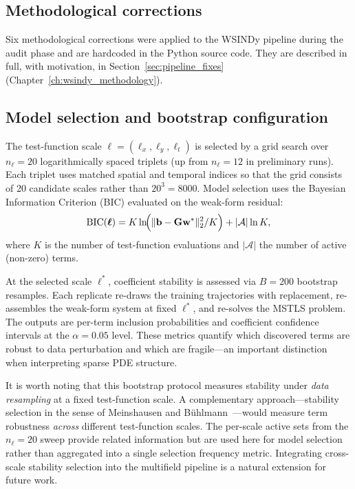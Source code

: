 \subsection{Methodological corrections}

Six methodological corrections were applied to the WSINDy pipeline during the
audit phase and are hardcoded in the Python source code.
They are described in full, with motivation, in
Section~\ref{sec:pipeline_fixes} (Chapter~\ref{ch:wsindy_methodology}).

\subsection{Model selection and bootstrap configuration}

The test-function scale $\boldsymbol{\ell} = (\ell_x, \ell_y, \ell_t)$ is
selected by a grid search over $n_{\ell} = 20$ logarithmically spaced
triplets (up from $n_{\ell} = 12$ in preliminary runs).  Each triplet uses
matched spatial and temporal indices so that the grid consists of 20 candidate
scales rather than $20^3 = 8000$.  Model selection uses the Bayesian
Information Criterion (BIC) evaluated on the weak-form residual:
\begin{equation}
  \mathrm{BIC}(\boldsymbol\ell)
  = K\ln\!\Bigl(\lVert\mathbf{b} - \mathbf{G}\mathbf{w}^*\rVert_2^2 / K\Bigr)
  + |\mathcal{A}|\ln K,
  \label{eq:wsindy_bic}
\end{equation}
where $K$ is the number of test-function evaluations and $|\mathcal{A}|$ the
number of active (non-zero) terms.

At the selected scale $\boldsymbol{\ell}^*$, coefficient stability is assessed
via $B = 200$ bootstrap resamples.  Each replicate re-draws the training
trajectories with replacement, re-assembles the weak-form system at fixed
$\boldsymbol{\ell}^*$, and re-solves the MSTLS problem.  The outputs are
per-term inclusion probabilities and coefficient confidence intervals at the
$\alpha = 0.05$ level.  These metrics quantify which discovered terms are
robust to data perturbation and which are fragile---an important distinction
when interpreting sparse PDE structure.

It is worth noting that this bootstrap protocol measures stability under
\emph{data resampling} at a fixed test-function scale.  A complementary
approach---stability selection in the sense of
Meinshausen and B\"uhlmann~\cite{meinshausen2010stability}---would measure
term robustness \emph{across} different test-function scales.  The per-scale
active sets from the $n_{\ell} = 20$ sweep provide related information but are
used here for model selection rather than aggregated into a single selection
frequency metric.  Integrating cross-scale stability selection into the
multifield pipeline is a natural extension for future work.

